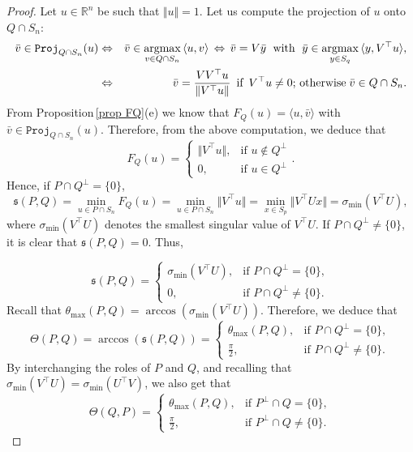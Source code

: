 \documentclass[hidelinks,onefignum,onetabnum]{siamart250211}
\theoremstyle{definition}
\theoremstyle{remark}
\newcommand{\R}{\mathbb R}
\newcommand{\by}{\bar{y}}
\newcommand{\bv}{\bar{v}}
\newcommand{\argmax}{\mathop{\rm argmax}}
\newcommand{\proj}{\mathtt{Proj}}
\begin{document}
\begin{proof}
Let $u\in\R^n$ be such that $\Vert u\Vert=1$. Let us compute the projection of $u$ onto $Q\cap S_n$:
\begin{eqnarray*}
\bv\in \proj_{Q\cap S_n}(u)&\Leftrightarrow&\bv\in\argmax_{v\in Q\cap S_n}\,\langle u,v\rangle\,\Leftrightarrow\, \bv=V\bar y\;\text{ with }\; \by\in\argmax_{y\in S_q}\,\langle y,V^\top u\rangle,\\
&\Leftrightarrow&\bv=\frac{VV^\top u}{\Vert V^\top u\Vert}\,\text{ if }\,V^\top u\neq 0; \,\text{otherwise}\;\bv\in Q\cap S_n.
\end{eqnarray*}
From Proposition\,\ref{prop FQ}(e) we know that $F_Q(u)=\langle u,\bv\rangle$ with $\bv\in \proj_{Q\cap S_n}(u)$. Therefore, from the above computation, we deduce that
\[F_Q(u)=\begin{cases}
\Vert V^\top u\Vert,&\text{if }u\notin Q^\perp\\
0,&\text{if }u\in Q^\perp
\end{cases}.\]
Hence, if $P\cap Q^\perp=\{0\}$,
\[\mathfrak{s}(P,Q)=\min_{u\in P\cap S_n}F_Q(u)=\min_{u\in P\cap S_n}\Vert V^\top u\Vert=\min_{x\in S_p}\Vert V^\top Ux\Vert=\sigma_{\min}(V^\top U),\]
where $\sigma_{\min}(V^\top U)$ denotes the smallest singular value of $V^\top U$. If $P\cap Q^\perp\neq\{0\}$, it is clear that $\mathfrak{s}(P,Q)=0$. Thus,

\[\mathfrak{s}(P,Q)=\begin{cases}
\sigma_{\min}(V^\top U),&\text{if }P\cap Q^\perp=\{0\},\\
0,&\text{if }P\cap Q^\perp\neq\{0\}.
\end{cases}\]
Recall that $\theta_{\max}(P,Q)=\arccos(\sigma_{\min}(V^\top U))$. Therefore, we deduce that
\begin{equation}\label{theta-arccos}
\Theta(P,Q)=\arccos(\mathfrak{s}(P,Q))=\begin{cases}
\theta_{\max}(P,Q),&\text{if }P\cap Q^\perp=\{0\},\\
\frac{\pi}{2},&\text{if }P\cap Q^\perp\neq\{0\}.
\end{cases}
\end{equation}
By interchanging the roles of $P$ and $Q$, and recalling that $\sigma_{\min}(V^\top U)=\sigma_{\min}(U^\top V)$, we also get that
\begin{equation}\label{theta-arccos2}
\Theta(Q,P)=\begin{cases}
\theta_{\max}(P,Q),&\text{if }P^\perp\cap Q=\{0\},\\
\frac{\pi}{2},&\text{if }P^\perp\cap Q\neq\{0\}.
\end{cases}
\end{equation}


\end{proof}
\end{document}
